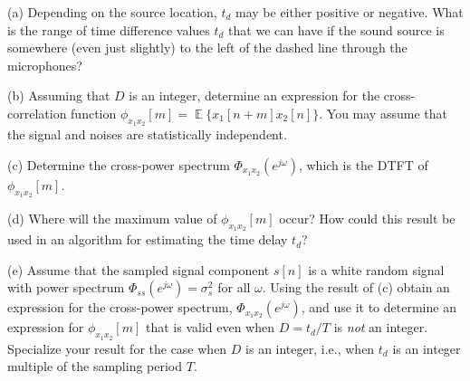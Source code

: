 \documentclass[12pt]{report}
\DeclareMathOperator{\E}{\mathbb{E}} %
\begin{document}
\begin{description}
\item{(a)}  Depending on the source location, $t_{d}$ may be either positive or negative. What is the range of time difference values $t_d$ that we can have if the sound source is somewhere (even just slightly) to the left of the dashed line through the microphones?
\item{(b)} Assuming that $D$ is an integer, determine an expression for the cross-correlation function $\phi_{x_1x_2}[m]=\E\{x_1[n+m]x_2[n]\}$. You may assume that the signal and noises are statistically independent.
\item{(c)} Determine the cross-power spectrum $\Phi_{x_1x_2}(e^{j\omega})$, which is the DTFT of $\phi_{x_1x_2}[m]$.
\item{(d)}  Where will the maximum value of $\phi_{x_1x_2}[m]$ occur?  How could this result be used in an algorithm for estimating the time delay $t_d$?
\item{(e)}  Assume that the sampled signal component $s[n]$ is a white random signal with  power spectrum $\Phi_{ss}(e^{j\omega}) = \sigma_s^2$ for all $\omega$. Using the result of (c) obtain an expression for the cross-power spectrum, $\Phi_{x_1x_2}(e^{j\omega})$, and use it to determine an expression for $\phi_{x_1x_2}[m]$ that is valid even when $D=t_d/T$ is \emph{not} an integer. Specialize your result for the case when $D$ is an integer, i.e., when $t_d$ is an integer multiple of the sampling period $T$.
\end{description}
\end{document}
